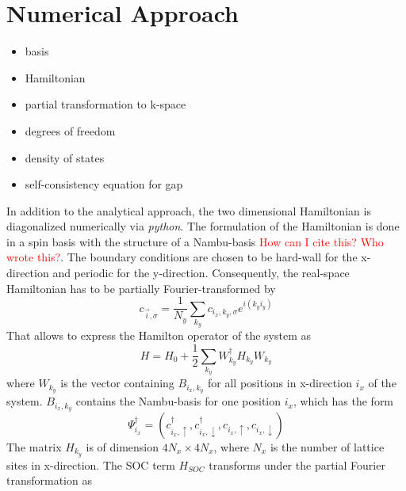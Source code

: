 \newpage
\section{Numerical Approach} \label{sec:numerical}
\begin{itemize}
    \item basis
    \item Hamiltonian
    \item partial transformation to k-space
    \item degrees of freedom
    \item density of states
    \item self-consistency equation for gap
\end{itemize}
In addition to the analytical approach, the two dimensional Hamiltonian is diagonalized numerically via \emph{python}.
The formulation of the Hamiltonian is done in a spin basis with the structure of a Nambu-basis \cite{original.pdf} \textcolor{red}{How can I cite this? Who wrote this?}.
The boundary conditions are chosen to be hard-wall for the x-direction and periodic for the y-direction.
Consequently, the real-space Hamiltonian has to be partially Fourier-transformed by
\begin{equation}\nonumber
    c_{\Vec{i},\sigma} = \frac{1}{N_y} \sum_{k_y} c_{i_x,k_y, \sigma} e^{i(k_y i_y)}
\end{equation}
That allows to express the Hamilton operator of the system as 
\begin{equation}\nonumber
    H = H_0 + \frac{1}{2} \sum_{k_y} W^{\dag}_{k_y}H_{k_y}W_{k_y}
\end{equation}
where $W_{k_y}$ is the vector containing $B_{i_x, k_y}$ for all positions in x-direction $i_x$ of the system.
$B_{i_x, k_y}$ contains the Nambu-basis for one position $i_x$, which has the form
\begin{equation}
    \Psi^{\dag}_{i_x} = \left( c^{\dag}_{i_x, \uparrow}, c^{\dag}_{i_x, \downarrow}, c_{i_x, \uparrow}, c_{i_x, \downarrow} \right)
\end{equation}
The matrix $H_{k_y}$ is of dimension $4N_x \times 4N_x$, where $N_x$ is the number of lattice sites in x-direction.\newline
The SOC term $H_{SOC}$ transforms under the partial Fourier transformation as
